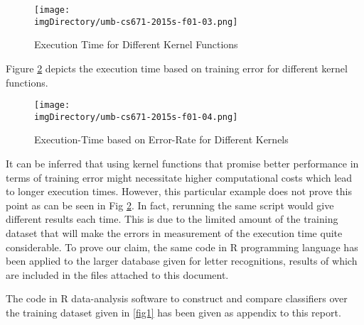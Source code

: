 \begin{figure}\centering
\texttt{[image: \\imgDirectory/umb-cs671-2015s-f01-03.png]}
\caption{Execution Time for Different Kernel Functions}\label{fig3}
\end{figure}

Figure \ref{fig4} depicts the execution time based on training error for different kernel functions.

\begin{figure}\centering
\texttt{[image: \\imgDirectory/umb-cs671-2015s-f01-04.png]}
\caption{Execution-Time based on Error-Rate for Different Kernels}\label{fig4}
\end{figure}

It can be inferred that using kernel functions that promise better performance in terms of training error might necessitate higher computational costs which lead to longer execution times.
However, this particular example does not prove this point as can be seen in Fig \ref{fig4}.
In fact, rerunning the same script would give different results each time.
This is due to the limited amount of the training dataset that will make the errors in measurement of the execution time quite considerable.
To prove our claim, the same code in R programming language has been applied to the larger database given for letter recognitions, results of which are included in the files attached to this document.

The code in R data-analysis software to construct and compare classifiers over the training dataset given in \ref{fig1} has been given as appendix to this report.
